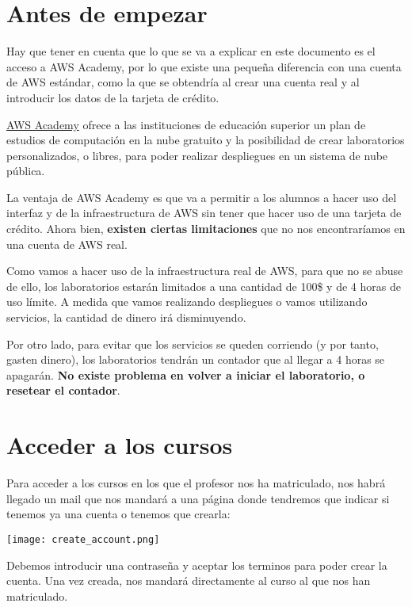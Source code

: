 \chapter{Antes de empezar}

Hay que tener en cuenta que lo que se va a explicar en este documento es el acceso a AWS Academy, por lo que existe una pequeña diferencia con una cuenta de AWS estándar, como la que se obtendría al crear una cuenta real y al introducir los datos de la tarjeta de crédito.

\href{https://aws.amazon.com/es/training/awsacademy/}{AWS Academy} ofrece a las instituciones de educación superior un plan de estudios de computación en la nube gratuito y la posibilidad de crear laboratorios personalizados, o libres, para poder realizar despliegues en un sistema de nube pública.

La ventaja de AWS Academy es que va a permitir a los alumnos a hacer uso del interfaz y de la infraestructura de AWS sin tener que hacer uso de una tarjeta de crédito. Ahora bien, \textbf{existen ciertas limitaciones} que no nos encontraríamos en una cuenta de AWS real.

Como vamos a hacer uso de la infraestructura real de AWS, para que no se abuse de ello, los laboratorios estarán limitados a una cantidad de 100\$ y de 4 horas de uso límite. A medida que vamos realizando despliegues o vamos utilizando servicios, la cantidad de dinero irá disminuyendo.

Por otro lado, para evitar que los servicios se queden corriendo (y por tanto, gasten dinero), los laboratorios tendrán un contador que al llegar a 4 horas se apagarán. \textbf{No existe problema en volver a iniciar el laboratorio, o resetear el contador}.


\chapter{Acceder a los cursos}

Para acceder a los cursos en los que el profesor nos ha matriculado, nos habrá llegado un mail que nos mandará a una página donde tendremos que indicar si tenemos ya una cuenta o tenemos que crearla:

\begin{center}
	\texttt{[image: create\_account.png]}
\end{center}

Debemos introducir una contraseña y aceptar los terminos para poder crear la cuenta. Una vez creada, nos mandará directamente al curso al que nos han matriculado.

